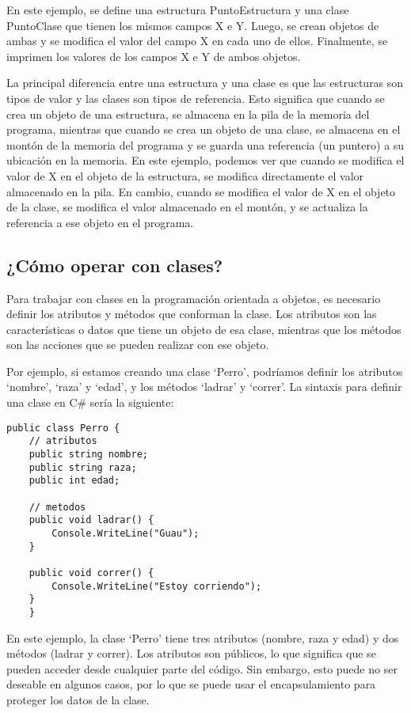 \documentclass[executivepaper]{article}
\begin{document}
En este ejemplo, se define una estructura PuntoEstructura y una clase PuntoClase que tienen los mismos campos X e Y. Luego, se crean objetos de ambas y se modifica el valor del campo X en cada uno de ellos. Finalmente, se imprimen los valores de los campos X e Y de ambos objetos.

La principal diferencia entre una estructura y una clase es que las estructuras son tipos de valor y las clases son tipos de referencia. Esto significa que cuando se crea un objeto de una estructura, se almacena en la pila de la memoria del programa, mientras que cuando se crea un objeto de una clase, se almacena en el montón de la memoria del programa y se guarda una referencia (un puntero) a su ubicación en la memoria. En este ejemplo, podemos ver que cuando se modifica el valor de X en el objeto de la estructura, se modifica directamente el valor almacenado en la pila. En cambio, cuando se modifica el valor de X en el objeto de la clase, se modifica el valor almacenado en el montón, y se actualiza la referencia a ese objeto en el programa.

\subsection{¿Cómo operar con clases?}

Para trabajar con clases en la programación orientada a objetos, es necesario definir los atributos y métodos que conforman la clase. Los atributos son las características o datos que tiene un objeto de esa clase, mientras que los métodos son las acciones que se pueden realizar con ese objeto.

Por ejemplo, si estamos creando una clase \enquote*{Perro}, podríamos definir los atributos \enquote*{nombre}, \enquote*{raza} y \enquote*{edad}, y los métodos \enquote*{ladrar} y \enquote*{correr}. La sintaxis para definir una clase en C\# sería la siguiente:

\begin{lstlisting}
public class Perro {
    // atributos
    public string nombre;
    public string raza;
    public int edad;

    // metodos
    public void ladrar() {
        Console.WriteLine("Guau");
    }

    public void correr() {
        Console.WriteLine("Estoy corriendo");
    }
    }
\end{lstlisting}

En este ejemplo, la clase \enquote*{Perro} tiene tres atributos (nombre, raza y edad) y dos métodos (ladrar y correr). Los atributos son públicos, lo que significa que se pueden acceder desde cualquier parte del código. Sin embargo, esto puede no ser deseable en algunos casos, por lo que se puede usar el encapsulamiento para proteger los datos de la clase.
\end{document}
